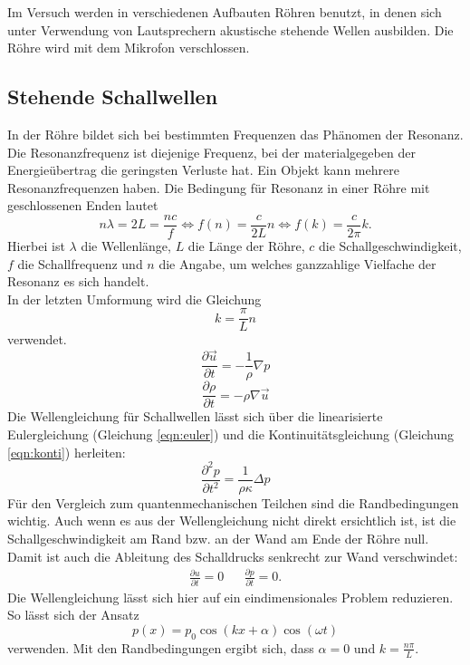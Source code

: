 Im Versuch werden in verschiedenen Aufbauten Röhren benutzt, in denen sich unter Verwendung von Lautsprechern akustische stehende Wellen ausbilden.
Die Röhre wird mit dem Mikrofon verschlossen.\\
%
\subsection{Stehende Schallwellen}
In der Röhre bildet sich bei bestimmten Frequenzen das Phänomen der Resonanz.
Die Resonanzfrequenz ist diejenige Frequenz, bei der materialgegeben der Energieübertrag die geringsten Verluste hat.
Ein Objekt kann mehrere Resonanzfrequenzen haben.
Die Bedingung für Resonanz in einer Röhre mit geschlossenen Enden lautet
\begin{equation}
  n \lambda = 2 L = \frac{n c}{f} \Leftrightarrow f(n) = \frac{c}{2L} n \Leftrightarrow f(k) = \frac{c}{2\pi} k.
  \label{eqn:dispersionschall}
\end{equation}
Hierbei ist $\lambda$ die Wellenlänge, $L$ die Länge der Röhre, $c$ die Schallgeschwindigkeit, $f$ die Schallfrequenz und $n$ die Angabe, um welches ganzzahlige Vielfache der Resonanz es sich handelt.\\
In der letzten Umformung wird die Gleichung
\begin{equation}
  k = \frac{\pi}{L} n
  \label{eqn:wellenzahl}
\end{equation}
verwendet.
%
\begin{equation}
  \frac{ \partial \vec{u}}{ \partial t} = - \frac{1}{\rho} \nabla p
  \label{eqn:euler}
\end{equation}
\begin{equation}
  \frac{\partial \rho}{ \partial t} = - \rho \nabla \vec{u}
  \label{eqn:konti}
\end{equation}
%
Die Wellengleichung für Schallwellen lässt sich über die linearisierte Eulergleichung (Gleichung \eqref{eqn:euler}) und die Kontinuitätsgleichung (Gleichung \eqref{eqn:konti}) herleiten:
\begin{equation}
  \frac{ \partial^2 p}{\partial t^2} = \frac{1}{\rho \kappa} \Delta p
  \label{eqn:schallwelle}
\end{equation}
Für den Vergleich zum quantenmechanischen Teilchen sind die Randbedingungen wichtig.
Auch wenn es aus der Wellengleichung nicht direkt ersichtlich ist, ist die Schallgeschwindigkeit am Rand bzw. an der Wand am Ende der Röhre null.
Damit ist auch die Ableitung des Schalldrucks senkrecht zur Wand verschwindet:
\begin{align*}
  \frac{ \partial u }{\partial t} = 0 && \frac{ \partial p }{ \partial t} = 0.
\end{align*}
Die Wellengleichung lässt sich hier auf ein eindimensionales Problem reduzieren.
So lässt sich der Ansatz
\begin{equation*}
  p(x)=p_{0} \cos{(kx + \alpha)} \cos{(\omega t)}
\end{equation*}
verwenden.
Mit den Randbedingungen ergibt sich, dass $\alpha=0$ und $k= \frac{n \pi}{L}$.
%
